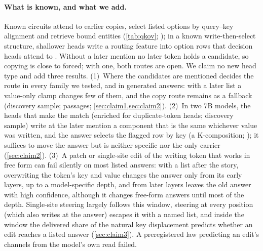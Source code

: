 \paragraph{What is known, and what we add.}
Known circuits attend to earlier copies, select listed options by query--key alignment and retrieve bound entities (\cref{tab:qkov}; \citealp{tulchinskii2024wise,feng2023binding,dai2024binding,prakash2024finetuning,prakash2025lookbacks,gurarieh2025mixing}); in a known write-then-select structure, shallower heads write a routing feature into option rows that decision heads attend to \citep{sun2026persuaded}. Without a later mention no later token holds a candidate, so copying is close to forced; with one, both routes are open. We claim no new head type and add three results.
(1)~Where the candidates are mentioned decides the route in every family we tested, and in generated answers: with a later list a value-only clamp changes few of them, and the copy route remains as a fallback (discovery sample; passages\rsk; \cref{sec:claim1,sec:claim2}).
(2)~In two 7B models, the heads that make the match (enriched for duplicate-token heads; discovery sample) write at the later mention a component that is the same whichever value was written, and the answer selects the flagged row by key (a K-composition; \citealp{elhage2021framework}); it suffices to move the answer but is neither specific nor the only carrier (\cref{sec:claim2}).
(3)~A patch or single-site edit of the writing token that works in free form can fail silently on most listed answers: with a list after the story, overwriting the token's key and value changes the answer only from its early layers, up to a model-specific depth, and from later layers leaves the old answer with high confidence, although it changes free-form answers until most of the depth. Single-site steering largely follows this window, steering at every position (which also writes at the answer) escapes it with a named list, and inside the window the delivered share of the natural key displacement predicts whether an edit reaches a listed answer (\cref{sec:claim3}). A preregistered law predicting an edit's channels from the model's own read failed.

